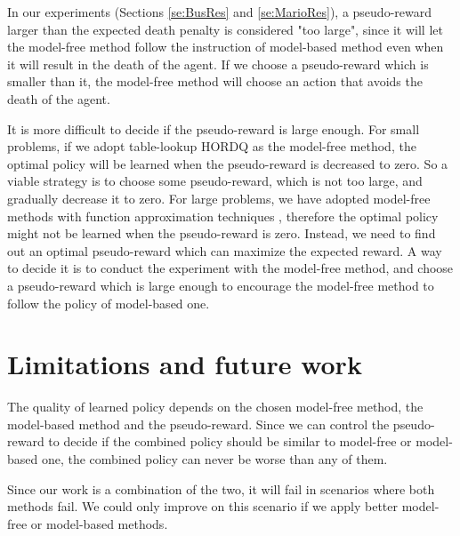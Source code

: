 In our experiments (Sections \ref{se:BusRes} and \ref{se:MarioRes}), a pseudo-reward larger than the expected death penalty is considered "too large", 
since it will let the model-free method follow the instruction of model-based method even 
when it will result in the death of the agent. If we choose a pseudo-reward which is smaller than it,
the model-free method will choose an action that avoids the death of the agent.

It is more difficult to decide if the pseudo-reward is large enough. 
For small problems, if we adopt table-lookup HORDQ as the model-free method,
the optimal policy will be learned when the pseudo-reward is decreased to zero.
So a viable strategy is to choose some pseudo-reward, which is not too large, and
gradually decrease it to zero.
For large problems, we have adopted model-free methods with function approximation techniques
, therefore the optimal policy might not be learned when the pseudo-reward is zero.
Instead, we need to find out an optimal pseudo-reward which can maximize the expected reward.
A way to decide it is to conduct the experiment with the model-free method,
and choose a pseudo-reward which is large enough to encourage
the model-free method to follow the policy of model-based one.

\section{Limitations and future work}

The quality of learned policy depends on the chosen model-free method,
the model-based method and the pseudo-reward. 
Since we can control the pseudo-reward to decide if the combined
policy should be similar to model-free or model-based one,
the combined policy can never be worse than any of them. 

Since our work is a combination of the two, it will fail in scenarios where both methods fail. 
We could only improve on this scenario if we apply better model-free or model-based methods. 


